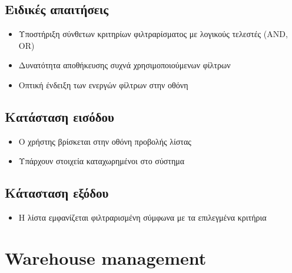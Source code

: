 \documentclass[12pt,a4paper,twoside]{book}
\begin{document}
\subsection{Ειδικές απαιτήσεις} %
\begin{itemize}
  \item Υποστήριξη σύνθετων κριτηρίων φιλτραρίσματος με λογικούς τελεστές (AND, OR)
  \item Δυνατότητα αποθήκευσης συχνά χρησιμοποιούμενων φίλτρων
  \item Οπτική ένδειξη των ενεργών φίλτρων στην οθόνη %
\end{itemize}

\subsection{Κατάσταση εισόδου} %
\begin{itemize}
  \item Ο χρήστης βρίσκεται στην οθόνη προβολής λίστας
  \item Υπάρχουν στοιχεία καταχωρημένοι στο σύστημα
\end{itemize}

\subsection{Κάτασταση εξόδου} %
\begin{itemize}
  \item Η λίστα εμφανίζεται φιλτραρισμένη σύμφωνα με τα επιλεγμένα κριτήρια
\end{itemize}

\section{Warehouse management}
\end{document}
